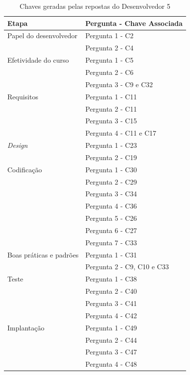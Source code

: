 \begin{table}[h]
	\centering
	\begin{tabular}{|m{4.8cm} | m{4.8cm} |}
		\hline
		\textbf{Etapa} & \textbf{Pergunta - Chave Associada} \\ \hline
		Papel do desenvolvedor & Pergunta 1 - C2 \\ \cline{2-2}
		& Pergunta 2 - C4 \\ \cline{2-2}
		\hline
		Efetividade do curso & Pergunta 1 - C5 \\ \cline{2-2}
		& Pergunta 2 - C6 \\ \cline{2-2}
		& Pergunta 3 - C9 e C32 \\ \cline{2-2}
		\hline
		Requisitos & Pergunta 1 - C11 \\ \cline{2-2}
		 & Pergunta 2 - C11 \\ \cline{2-2}
		& Pergunta 3 - C15 \\ \cline{2-2}
		& Pergunta 4 - C11 e C17 \\ \cline{2-2}
		\hline
		\textit{Design} & Pergunta 1 - C23 \\ \cline{2-2}
		& Pergunta 2 - C19 \\ \cline{2-2}
		\hline
		Codificação & Pergunta 1 - C30 \\ \cline{2-2}
		& Pergunta 2 - C29 \\ \cline{2-2}
		& Pergunta 3 - C34 \\ \cline{2-2}
		& Pergunta 4 - C36 \\ \cline{2-2}
		& Pergunta 5 - C26 \\ \cline{2-2}
		& Pergunta 6 - C27 \\ \cline{2-2}
		& Pergunta 7 - C33 \\ \cline{2-2} \hline
		Boas práticas e padrões & Pergunta 1 - C31 \\ \cline{2-2}
		& Pergunta 2 - C9, C10 e C33 \\ \cline{2-2}
		\hline
		Teste & Pergunta 1 - C38 \\ \cline{2-2}
		& Pergunta 2 - C40 \\ \cline{2-2}
		& Pergunta 3 - C41 \\ \cline{2-2}
		& Pergunta 4 - C42 \\ \cline{2-2}
		\hline
		Implantação & Pergunta 1 - C49 \\ \cline{2-2}
		& Pergunta 2 - C44 \\ \cline{2-2}
		& Pergunta 3 - C47 \\ \cline{2-2}
		& Pergunta 4 - C48 \\ \cline{2-2}
		\hline
	\end{tabular}

	\caption{Chaves geradas pelas repostas do Desenvolvedor 5}
	\label{tab07}
\end{table}

